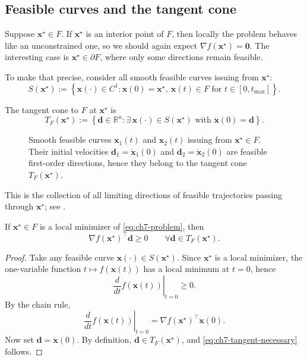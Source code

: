 \subsection{Feasible curves and the tangent cone}
\label{sec:ch7-tangent}
Suppose $\mathbf{x}^\star\in F$. If $\mathbf{x}^\star$ is an interior point of $F$,
then locally the problem behaves like an unconstrained one, so we should again
expect $\nabla f(\mathbf{x}^\star)=\mathbf{0}$. The interesting case is
$\mathbf{x}^\star\in \partial F$, where only some directions remain feasible.

To make that precise, consider all smooth feasible curves issuing
from $\mathbf{x}^\star$:
\[
  S(\mathbf{x}^\star)
  := \left\{
    \mathbf{x}(\cdot)\in C^1:
    \mathbf{x}(0)=\mathbf{x}^\star,\ 
    \mathbf{x}(t)\in F \text{ for } t\in[0,t_{\max}]
  \right\}.
\]

\begin{definition}
\label{def:ch7-tangent-cone}
The tangent cone to $F$ at $\mathbf{x}^\star$ is
\[
  T_F(\mathbf{x}^\star)
  := \left\{
    \mathbf{d}\in\mathbb{R}^n:
    \exists\, \mathbf{x}(\cdot)\in S(\mathbf{x}^\star)
    \text{ with }
    \dot{\mathbf{x}}(0)=\mathbf{d}
  \right\}.
\]
\end{definition}

\begin{figure}[ht]
    \centering
    \caption{Smooth feasible curves $\mathbf{x}_1(t)$ and $\mathbf{x}_2(t)$
    issuing from $\mathbf{x}^\star\in F$. Their initial velocities
    $\mathbf{d}_1=\dot{\mathbf{x}}_1(0)$ and $\mathbf{d}_2=\dot{\mathbf{x}}_2(0)$
    are feasible first-order directions, hence they belong to the tangent cone
    $T_F(\mathbf{x}^\star)$.}
    \label{fig:ch7-tangent-cone}
\end{figure}
This is the collection of all limiting directions of feasible trajectories
passing through $\mathbf{x}^\star$; see \Cref{fig:ch7-tangent-cone}.

\begin{claim}
\label{clm:ch7-tangent-necessary}
If $\mathbf{x}^\star\in F$ is a local minimizer of \eqref{eq:ch7-problem}, then
\begin{equation}
  \label{eq:ch7-tangent-necessary}
  \nabla f(\mathbf{x}^\star)^\top \mathbf{d} \ge 0
  \qquad \forall \mathbf{d}\in T_F(\mathbf{x}^\star).
\end{equation}
\end{claim}
\begin{proof}
Take any feasible curve $\mathbf{x}(\cdot)\in S(\mathbf{x}^\star)$. Since
$\mathbf{x}^\star$ is a local minimizer, the one-variable function
$t\mapsto f(\mathbf{x}(t))$ has a local minimum at $t=0$, hence
\[
  \left.\frac{d}{dt} f(\mathbf{x}(t))\right|_{t=0}\ge 0.
\]
By the chain rule,
\[
  \left.\frac{d}{dt} f(\mathbf{x}(t))\right|_{t=0}
  = \nabla f(\mathbf{x}^\star)^\top \dot{\mathbf{x}}(0).
\]
Now set $\mathbf{d}=\dot{\mathbf{x}}(0)$. By definition,
$\mathbf{d}\in T_F(\mathbf{x}^\star)$, and \eqref{eq:ch7-tangent-necessary}
follows.
\end{proof}

